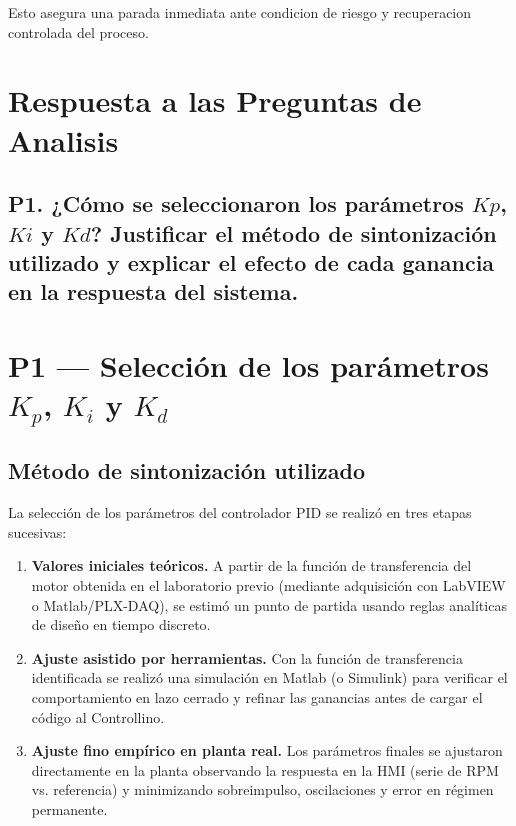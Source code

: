 \documentclass[journal, onecolumn]{IEEEtran}
\begin{document}
Esto asegura una parada inmediata ante condicion de riesgo y recuperacion controlada del proceso.





\section{Respuesta a las Preguntas de Analisis}

\subsection*{P1. ¿Cómo se seleccionaron los parámetros $Kp$, $Ki$ y $Kd$? Justificar el método de sintonización utilizado y explicar el efecto de cada ganancia en la respuesta del sistema.}
\section{P1 — Selección de los parámetros $K_p$, $K_i$ y $K_d$}

\subsection{Método de sintonización utilizado}

La selección de los parámetros del controlador PID se realizó en tres etapas
sucesivas:

\begin{enumerate}
  \item \textbf{Valores iniciales teóricos.}
        A partir de la función de transferencia del motor obtenida en el
        laboratorio previo (mediante adquisición con LabVIEW o Matlab/PLX-DAQ),
        se estimó un punto de partida usando reglas analíticas de diseño en
        tiempo discreto.

  \item \textbf{Ajuste asistido por herramientas.}
        Con la función de transferencia identificada se realizó una simulación
        en Matlab (o Simulink) para verificar el comportamiento en lazo cerrado
        y refinar las ganancias antes de cargar el código al Controllino.

  \item \textbf{Ajuste fino empírico en planta real.}
        Los parámetros finales se ajustaron directamente en la planta
        observando la respuesta en la HMI (serie de RPM vs. referencia) y
        minimizando sobreimpulso, oscilaciones y error en régimen permanente.
\end{enumerate}
\end{document}
